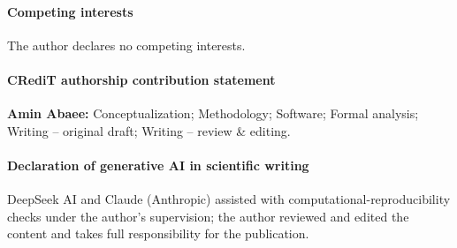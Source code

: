 \paragraph{Competing interests} The author declares no competing interests.

\paragraph{CRediT authorship contribution statement} \textbf{Amin Abaee:} Conceptualization; Methodology; Software; Formal analysis; Writing -- original draft; Writing -- review \& editing.

\paragraph{Declaration of generative AI in scientific writing} DeepSeek AI and Claude (Anthropic) assisted with computational-reproducibility checks under the author's supervision; the author reviewed and edited the content and takes full responsibility for the publication.
